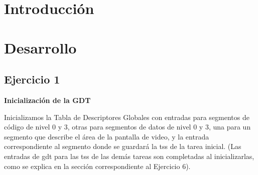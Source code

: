 \documentclass[a4paper]{article}
\begin{document}
\thispagestyle{empty}

\maketitle
\newpage

\thispagestyle{empty}
\vfill

\thispagestyle{empty}
\vspace{3cm}
\tableofcontents
\newpage

\newpage

\section{Introducción}

\newpage

\section{Desarrollo} 

\subsection{Ejercicio 1}

\textbf{Inicialización de la GDT}

Inicializamos la Tabla de Descriptores Globales con entradas para segmentos de código de nivel 0 y 3, otras para segmentos de datos de nivel 0 y 3, una para un segmento que describe el área de la pantalla de video, y la entrada correspondiente al segmento donde se guardará la tss de la tarea inicial. (Las entradas de gdt para las tss de las demás tareas son completadas al inicializarlas, como se explica en la sección correspondiente al Ejercicio 6).
\end{document}
